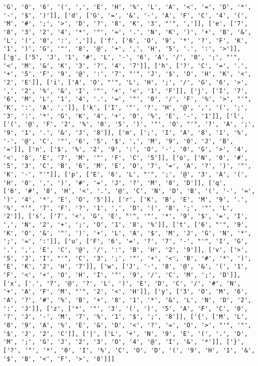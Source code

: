 \documentclass{article}
\begin{document}
\begin{verbatim}
'G', '0', '6', '(', ',', 'E', 'H', '%', 'L', 'A', '<', '=', 'D', '*', '-', '$', ')']], ['d', ['G', '=', '&', '-', 'A', 'F', 'C', '4', '(', 'M', '#', ';', '>', 'D', '?', '8', 'K', '3', "'", ',']], ['e', ['7', '8', '3', '2', '4', '*', '"', '=', '.', 'N', 'K', ')', '+', 'B', '&', 'L', '(', '0', ':', ',']], ['f', ['6', 'O', '9', '*', '?', 'F', 'K', '1', ')', 'G', '"', '8', '@', '+', ',', 'H', '5', '.', ':', '>']], ['g', ['5', 'J', '1', '#', 'L', '-', '6', 'A', '/', '0', ';', "'", '<', 'M', '&', 'K', '3', '?', '4', '7']], ['h', ['?', 'C', '=', '.', '+', '5', 'F', '9', '@', ':', '7', "'", 'J', '$', 'O', 'H', 'K', '<', '2', 'E']], ['i', ['A', 'O', "'", 'L', 'H', ';', '/', 'G', '6', '>', ',', '2', '%', '&', 'I', '"', '+', '<', '1', 'F']], ['j', ['I', '7', '6', 'M', 'L', '1', '4', '.', '=', '"', '0', '/', 'F', '%', '>', "'", 'K', ':', 'A', ',']], ['k', ['I', '"', '?', 'H', '@', ',', '(', ';', '3', ':', '*', 'G', 'K', '4', '+', '0', '%', 'E', '-', '1']], ['l', ['(', '@', 'F', '2', '%', '0', '5', ')', '"', 'O', "'", '?', 'A', ';', '9', '1', '.', '&', 'J', '8']], ['m', [';', 'I', 'A', '8', '1', '%', '-', '@', 'C', '"', '6', '5', '$', ',', 'M', '9', '0', 'J', 'B', '=']], ['n', ['$', '%', '2', '9', ':', 'O', '-', '0', 'G', '>', '4', '<', '8', 'E', '7', 'M', '"', 'F', 'C', '5']], ['o', ['N', '0', '#', '5', '3', 'C', 'B', '6', 'M', 'E', 'O', '7', '=', 'A', '?', ')', '"', 'K', '-', "'"]], ['p', ['E', '6', 'L', "'", ';', '@', '3', 'A', '(', 'H', '0', ',', ')', '#', '=', 'J', '?', 'M', '8', 'D']], ['q', 
['6', '#', '8', 'H', '<', '.', '@', 'C', 'N', 'D', 'B', '(', '-', '=', ')', '4', '*', 'E', 'O', '5']], ['r', ['K', 'B', 'E', 'M', '9', '.', '%', "'", '7', 'F', '?', '1', ',', 'D', '(', '8', ';', '"', 'L', '2']], ['s', ['7', '<', 'G', 'E', "'", '"', '*', '9', '$', '=', 'I', ',', 'N', '2', '+', ';', 'O', '1', '8', '%']], ['t', ['6', "'", '9', 'K', 'O', '&', '"', ')', '+', 'L', 'A', '$', 'M', 'J', 'G', 'N', '*', ';', '=', ':']], ['u', ['F', '6', '=', '?', '7', '-', "'", 'I', 'G', '.', ',', 'E', 'C', '@', '/', ':', 'B', 'H', '2', '9']], ['v', ['>', '5', 'J', 'I', "'", 'C', '3', ';', '"', '+', '<', 'B', '#', '*', ')', 'E', 'K', '2', 'H', '7']], ['w', ['J', '-', '8', '@', '&', '(', '1', 'F', '<', '+', 'O', 'H', 'I', '"', '9', '/', 'C', 'M', ';', 'D']], ['x', ['.', '7', '@', '?', 'L', ')', 'E', 'D', 'C', '/', '#', 'N', '+', 'A', 'F', 'M', "'", '2', '<', 'H']], ['y', ['3', 'O', 'M', '6', 'A', '?', '#', '%', 'B', '+', '8', '1', '*', '&', 'L', 'N', 'D', '2', ':', 'J']], ['z', ['*', '"', '3', '(', ')', '5', 'A', 'F', 'C', '0', '?', 'J', '-', 'M', '7', '%', '1', '$', ';', '8']], ['{', ['M', 'L', '0', '9', 'A', '%', 'E', '&', 'D', '<', '?', '=', 'O', '>', "'", '"', '$', 'J', '2', 'C']], ['|', ['L', '+', 'N', '9', 'E', '(', '.', 'D', 'M', ';', 'G', 'J', '2', '3', 'O', '4', '@', 'I', '&', '*']], ['}', ['?', '"', '*', '0', 'I', '%', 'C', 'O', 'D', '(', '9', 'H', '1', '&', '$', 'B', '<', 'F', '>', '8']]]

\end{verbatim}
\end{document}
